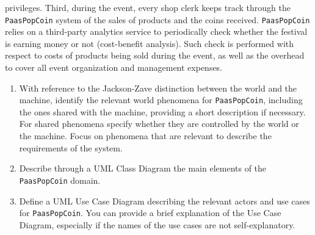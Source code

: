 privileges. Third, during the event, every shop clerk keeps track through the \texttt{PaasPopCoin} system of the sales of products and the coins received. \texttt{PaasPopCoin} relies on a 
third-party analytics service to periodically check whether the festival is earning money or not (cost-benefit analysis). Such check is performed with respect to costs of 
products being sold during the event, as well as the overhead to cover all event organization and management expenses. 
\begin{enumerate}
    \item With reference to the Jackson-Zave distinction between the world and the machine, identify the relevant world phenomena for \texttt{PaasPopCoin}, including the ones shared 
        with the machine, providing a short description if necessary. For shared phenomena specify whether they are controlled by the world or the machine. Focus on phenomena 
        that are relevant to describe the requirements of the system.
    \item Describe through a UML Class Diagram the main elements of the \texttt{PaasPopCoin} domain. 
    \item Define a UML Use Case Diagram describing the relevant actors and use cases for \texttt{PaasPopCoin}. 
        You can provide a brief explanation of the Use Case Diagram, especially if the names of the use cases are not self-explanatory.
\end{enumerate}

